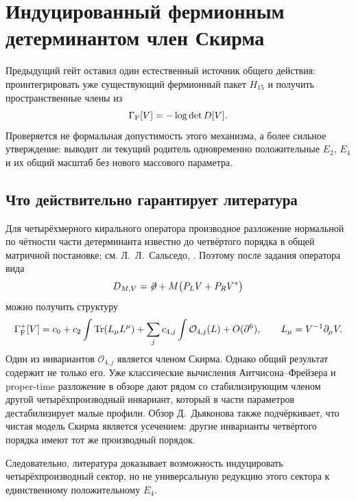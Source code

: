\chapter{Индуцированный фермионным детерминантом член Скирма}

Предыдущий гейт оставил один естественный источник общего действия:
проинтегрировать уже существующий фермионный пакет $H_{15}$ и получить
пространственные члены из
\begin{equation}
 \Gamma_{\rm F}[V]=-\log\det D[V].
 \label{eq:v5-fermion-determinant}
\end{equation}
Проверяется не формальная допустимость этого механизма, а более сильное
утверждение: выводит ли текущий родитель одновременно положительные
$E_2$, $E_4$ и их общий масштаб без нового массового параметра.

\section{Что действительно гарантирует литература}

Для четырёхмерного кирального оператора производное разложение нормальной
по чётности части детерминанта известно до четвёртого порядка в общей
матричной постановке; см. Л.~Л.~Сальседо,
. Поэтому после задания оператора вида
\begin{equation}
 D_{M,V}=\mathord{\not\!\partial}
 +M\bigl(P_LV+P_RV^*\bigr)
 \label{eq:v5-chiral-dirac-coupling}
\end{equation}
можно получить структуру
\begin{equation}
 \Gamma_{\rm F}^{+}[V]
 =c_0+c_2\int\operatorname{Tr}(L_\mu L^\mu)
 +\sum_jc_{4,j}\int\mathcal O_{4,j}(L)+O(\partial^6),
 \qquad L_\mu=V^{-1}\partial_\mu V.
 \label{eq:v5-fermion-derivative-expansion}
\end{equation}
Один из инвариантов $\mathcal O_{4,j}$ является членом Скирма. Однако
общий результат содержит не только его. Уже классические вычисления
Аитчисона--Фрейзера и proper-time разложение в обзоре
 дают рядом со стабилизирующим членом другой
четырёхпроизводный инвариант, который в части параметров дестабилизирует
малые профили. Обзор Д.~Дьяконова  также
подчёркивает, что чистая модель Скирма является усечением: другие
инварианты четвёртого порядка имеют тот же производный порядок.

Следовательно, литература доказывает возможность индуцировать
четырёхпроизводный сектор, но не универсальную редукцию этого сектора к
единственному положительному $E_4$.

